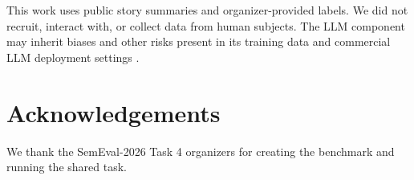 \documentclass[11pt]{article}
\begin{document}
This work uses public story summaries and organizer-provided labels. We did not recruit, interact with, or collect data from human subjects. The LLM component may inherit biases and other risks present in its training data and commercial LLM deployment settings \citep{weidinger2022taxonomy}.

\section*{Acknowledgements}

We thank the SemEval-2026 Task 4 organizers for creating the benchmark and running the shared task.


\end{document}
